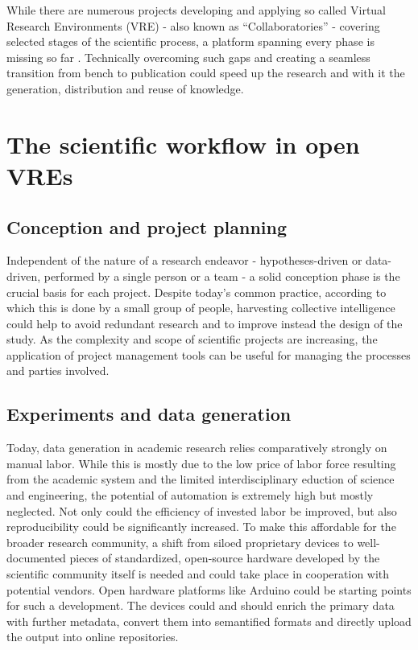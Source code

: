 \documentclass{article}
\begin{document}
While there are numerous projects developing and applying so called
Virtual Research Environments (VRE) - also known as
``Collaboratories'' - covering selected stages of the scientific
process, a platform spanning every phase is missing so far
\cite{Carusi}. Technically overcoming such gaps and creating a
seamless transition from bench to publication could speed up the
research and with it the generation, distribution and reuse of
knowledge.

\section{The scientific workflow in open VREs}

\subsection{Conception and project planning}

Independent of the nature of a research endeavor - hypotheses-driven
or data-driven, performed by a single person or a team - a solid
conception phase is the crucial basis for each project. Despite
today's common practice, according to which this is done by a small
group of people, harvesting collective intelligence could help to
avoid redundant research and to improve instead the design of the
study. As the complexity and scope of scientific projects are
increasing, the application of project management tools can be useful
for managing the processes and parties involved.

\subsection{Experiments and data generation}

Today, data generation in academic research relies comparatively
strongly on manual labor. While this is mostly due to the low price of
labor force resulting from the academic system and the limited
interdisciplinary eduction of science and engineering, the potential
of automation is extremely high but mostly neglected. Not only could
the efficiency of invested labor be improved, but also reproducibility
could be significantly increased. To make this affordable for the
broader research community, a shift from siloed proprietary devices to
well-documented pieces of standardized, open-source hardware developed
by the scientific community itself is needed and could take place in
cooperation with potential vendors. Open hardware platforms like
Arduino could be starting points for such a development. The devices
could and should enrich the primary data with further metadata,
convert them into semantified formats and directly upload the output
into online repositories.\\
\end{document}
